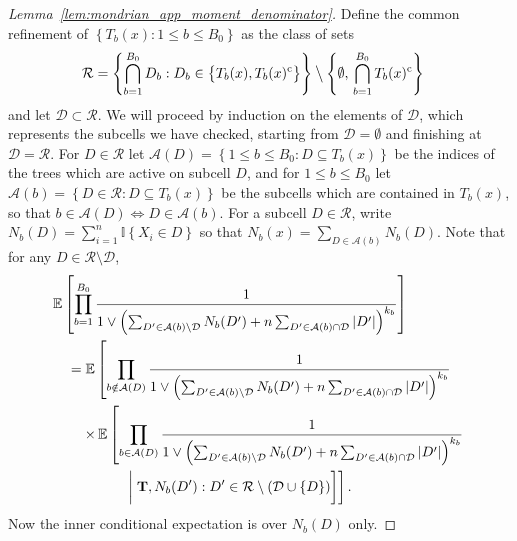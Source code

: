\documentclass[11pt,lof]{puthesis}
\newcommand{\E}{\ensuremath{\mathbb{E}}}
\newcommand{\I}{\ensuremath{\mathbb{I}}}
\newcommand{\comp}{\ensuremath{\mathrm{c}}}
\newcommand{\bT}{\ensuremath{\mathbf{T}}}
\newcommand{\cR}{\ensuremath{\mathcal{R}}}
\newcommand{\cA}{\ensuremath{\mathcal{A}}}
\newcommand{\cD}{\ensuremath{\mathcal{D}}}
\newcommand{\bigsetminus}{\mathbin{\big\backslash}}
\theoremstyle{break}
\theoremstyle{proof}
\newtheorem{proof}{Proof}
\begin{document}
\begin{proof}[Lemma~\ref{lem:mondrian_app_moment_denominator}]

  Define the common refinement of
  $\left\{ T_b(x) : 1 \leq b \leq {B_0} \right\}$ as
  the class of sets
  \begin{align*}
    \cR
    &= \left\{ \bigcap_{b=1}^{B_0} D_b :
      D_b \in
      \big\{ T_b(x), T_b(x)^{\comp} \big\}
    \right\}
    \bigsetminus
    \left\{
      \emptyset,\,
      \bigcap_{b=1}^{B_0}
      T_b(x)^\comp
    \right\}
  \end{align*}
  and let $\cD \subset \cR$.
  We will proceed by induction on the elements of $\cD$,
  which represents the subcells we have checked,
  starting from $\cD = \emptyset$ and finishing at $\cD = \cR$.
  For $D \in \cR$ let
  $\cA(D) = \left\{ 1 \leq b \leq {B_0} : D \subseteq T_b(x) \right\}$
  be the indices of the trees which are active on subcell $D$,
  and for $1 \leq b \leq {B_0}$ let
  $\cA(b) = \left\{ D \in \cR : D \subseteq T_b(x) \right\}$
  be the subcells which are contained in $T_b(x)$,
  so that $b \in \cA(D) \iff D \in \cA(b)$.
  For a subcell $D \in \cR$,
  write $N_b(D) = \sum_{i=1}^{n} \I \left\{ X_i \in D \right\}$
  so that $N_b(x) = \sum_{D \in \cA(b)} N_b(D)$.
  Note that for any $D \in \cR \setminus \cD$,
  \begin{align*}
    &\E \left[
      \prod_{b=1}^{B_0}
      \frac{1}{
        1 \vee \left(
          \sum_{D' \in \cA(b) \setminus \cD}
          N_b(D')
          + n \sum_{D' \in \cA(b) \cap \cD}
          |D'|
        \right)^{k_b}
      }
    \right] \\
    &\quad=
    \E \left[
      \prod_{b \notin \cA(D)}
      \frac{1}{
        1 \vee \left(
          \sum_{D' \in \cA(b) \setminus \cD}
          N_b(D')
          + n \sum_{D' \in \cA(b) \cap \cD}
          |D'|
        \right)^{k_b}
      } \right. \\
      &\left.
      \qquad
      \times\,\E\left[
        \prod_{b \in \cA(D)}
        \frac{1}{
          1 \vee \left(
            \sum_{D' \in \cA(b) \setminus \cD}
            N_b(D')
            + n \sum_{D' \in \cA(b) \cap \cD}
            |D'|
          \right)^{k_b}
        } \right.\right. \\
        &\left.\left.
        \quad\qquad\qquad\biggm|
        \bT,
        N_b(D') : D' \in \cR
        \setminus
        (\cD \cup \{D\})
      \right]
    \right].
  \end{align*}
  Now the inner conditional expectation is over $N_b(D)$ only.

\end{proof}
\end{document}
